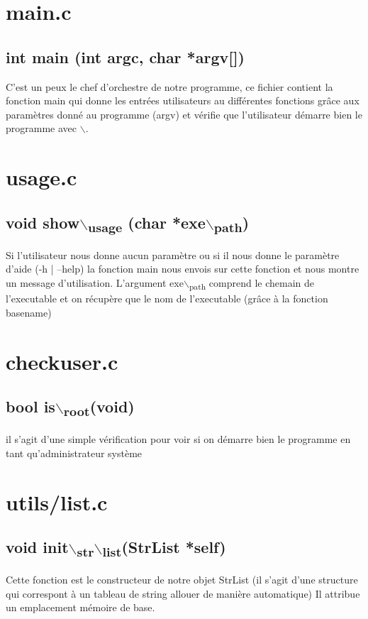 \documentclass[a4paper]{report}
\begin{document}
\chapter{main.c}
\label{sec:orgf1590b0}
\section{int main (int argc, char *argv[])}
\label{sec:orge86ec9a}
C'est un peux le chef d'orchestre de notre programme, ce fichier contient la fonction main qui donne les entrées utilisateurs au différentes fonctions grâce
aux paramètres donné au programme (argv) et vérifie que l'utilisateur démarre bien le programme avec \sudo$\backslash$.

\chapter{usage.c}
\label{sec:org8dbb097}
\section{void show$\backslash$\textsubscript{usage} (char *exe$\backslash$\textsubscript{path})}
\label{sec:org48e8cb6}
Si l'utilisateur nous donne aucun paramètre ou si il nous donne le paramètre d'aide (-h | --help)
la fonction main nous envois sur cette fonction et nous montre un message d'utilisation. L'argument exe$\backslash$\textsubscript{path} comprend le chemain de l'executable
et on récupère que le nom de l'executable (grâce à la fonction basename)

\chapter{checkuser.c}
\label{sec:org1b8ba7b}
\section{bool is$\backslash$\textsubscript{root}(void)}
\label{sec:org80b9369}
il s'agit d'une simple vérification pour voir si on démarre bien le programme en tant qu'administrateur système
\chapter{utils/list.c}
\label{sec:org5e94d7e}
\section{void init$\backslash$\textsubscript{str}$\backslash$\textsubscript{list}(StrList *self)}
\label{sec:org5781110}
Cette fonction est le constructeur de notre objet StrList (il s'agit d'une structure qui correspont à un tableau de string allouer de manière automatique)
Il attribue un emplacement mémoire de base.
\end{document}
